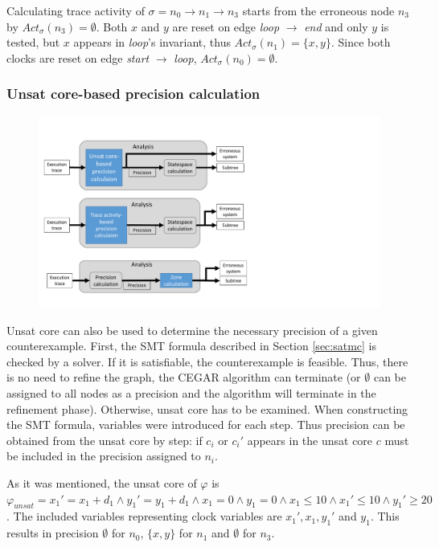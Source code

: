 \begin{runningExample}
\begin{runningExample}
	Calculating trace activity of $\sigma= n_0 \to n_1 \to n_3$ starts from the erroneous node $n_3$ by $Act_\sigma(n_3)=\emptyset$. Both $x$ and $y$ are reset on edge \emph{loop} $\to$ \emph{end} and only $y$ is tested, but $x$ appears in \emph{loop}'s invariant, thus $Act_\sigma(n_1)=\{x,y\}$. Since both clocks are reset on edge \emph{start} $\to$ \emph{loop}, $Act_\sigma(n_0)=\emptyset$.
\end{runningExample}

\subsubsection{Unsat core-based precision calculation}

\begin{figure}[h]
	\centering
	\includegraphics[width=\textwidth]{include/figures/modules_ssp_anal_uncore}
\end{figure}


Unsat core can also be used to determine the necessary precision of a given counterexample. First, the SMT formula described in Section \ref{sec:satmc} is checked by a solver. If it is satisfiable, the counterexample is feasible. Thus, there is no need to refine the graph, the CEGAR algorithm can terminate (or $\emptyset$ can be assigned to all nodes as a precision and the algorithm will terminate in the refinement phase). Otherwise, unsat core has to be examined. When constructing the SMT formula, variables were introduced for each step. Thus precision can be obtained from the unsat core by step: if $c_i$ or $c_i'$ appears in the unsat core $c$ must be included in the precision assigned to $n_i$.

\begin{runningExample}
	As it was mentioned, the unsat core of $\varphi$ is $\varphi_{unsat}=x_1'=x_1+d_1 \wedge y_1'=y_1+d_1 \wedge x_1=0 \wedge y_1=0 \wedge x_1 \leq 10 \wedge x_1' \leq 10 \wedge y_1' \geq 20$. The included variables representing clock variables are $x_1',x_1,y_1'$ and $y_1$. This results in precision $\emptyset$ for $n_0$, $\{x,y\}$ for $n_1$ and $\emptyset$ for $n_3$.
\end{runningExample}


\end{runningExample}

